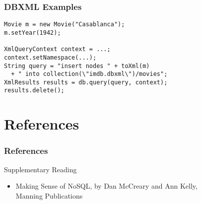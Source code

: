 \documentclass[dvipsnames]{beamer}
\theoremstyle{plain}
\begin{document}
\begin{frame}[fragile]
  \frametitle{DBXML Examples}

  \begin{example}[insert]
    \begin{lstlisting}
Movie m = new Movie("Casablanca");
m.setYear(1942);

XmlQueryContext context = ...;
context.setNamespace(...);
String query = "insert nodes " + toXml(m)
  + " into collection(\"imdb.dbxml\")/movies";
XmlResults results = db.query(query, context);
results.delete();
    \end{lstlisting}
  \end{example}
\end{frame}

\section*{References}

\begin{frame}
  \frametitle{References}

  \begin{block}{Supplementary Reading}
    \begin{itemize}
      \item Making Sense of NoSQL, by Dan McCreary and Ann Kelly,\\
        Manning Publications
    \end{itemize}
  \end{block}
\end{frame}
\end{document}
